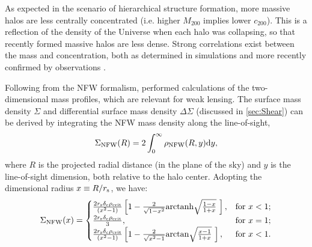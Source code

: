 As expected in the scenario of hierarchical structure formation, more massive halos are less centrally concentrated (i.e. higher $M_{200}$ implies lower $c_{200}$). This is a reflection of the density of the Universe when each halo was collapsing, so that recently formed massive halos are less dense. Strong correlations exist between the mass and concentration, both as determined in simulations \citep{Duffy08,Prada12,Dutton14} and more recently confirmed by observations \citep{Okabe13,Merten14}. 

Following from the \ac{NFW} formalism, \citet{Wright00} performed calculations of the two-dimensional mass profiles, which are relevant for weak lensing. The surface mass density $\Sigma$ and differential surface mass density $\Delta\Sigma$ (discussed in \autoref{sec:Shear}) can be derived by integrating the \ac{NFW} mass density along the line-of-sight,
\begin{equation}
\Sigma_{\rm NFW} (R) = 2 \int_0^{\infty} \rho_{\rm NFW} (R,y) {\rm d}y,
\end{equation}
where $R$ is the projected radial distance (in the plane of the sky) and $y$ is the line-of-sight dimension, both relative to the halo center. Adopting the dimensional radius $x \equiv R/r_{\rm s}$, we have:
\begin{equation}
\Sigma_{\rm NFW} (x) = 
    \begin{cases}
        \frac{2 r_{\rm s} \delta_{\rm c} \rho_{\rm crit}}{(x^2 - 1)} \left[ 1 - \frac{2}{\sqrt{1-x^2}} {\rm arctanh} \sqrt{\frac{1-x}{1+x}} \ \right], & \text{for } x < 1; \\
        \frac{2 r_{\rm s} \delta_{\rm c} \rho_{\rm crit}}{3},              & \text{for } x = 1; \\
        \frac{2 r_{\rm s} \delta_{\rm c} \rho_{\rm crit}}{(x^2 - 1)} \left[ 1 - \frac{2}{\sqrt{x^2 - 1}} {\rm arctan} \sqrt{\frac{x-1}{1+x}} \ \right], & \text{for } x < 1.
    \end{cases}
\end{equation}

